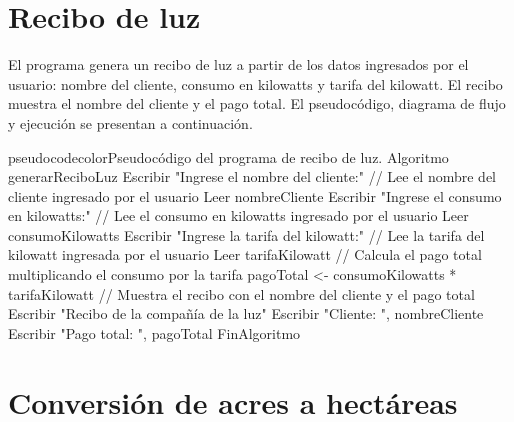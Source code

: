 \documentclass[
	spanish, %
	letterpaper, oneside
]{article}
\begin{document}


\section{Recibo de luz}

El programa genera un recibo de luz a partir de los datos ingresados por el usuario: nombre del cliente, consumo en kilowatts y tarifa del kilowatt. El recibo muestra el nombre del cliente y el pago total. El pseudocódigo, diagrama de flujo y ejecución se presentan a continuación.

\begin{sourcecode}{pseudocodecolor}{Pseudocódigo del programa de recibo de luz.}
Algoritmo generarReciboLuz
    Escribir "Ingrese el nombre del cliente:"
    // Lee el nombre del cliente ingresado por el usuario
    Leer nombreCliente
    Escribir "Ingrese el consumo en kilowatts:"
    // Lee el consumo en kilowatts ingresado por el usuario
    Leer consumoKilowatts
    Escribir "Ingrese la tarifa del kilowatt:"
    // Lee la tarifa del kilowatt ingresada por el usuario
    Leer tarifaKilowatt
    // Calcula el pago total multiplicando el consumo por la tarifa
    pagoTotal <- consumoKilowatts * tarifaKilowatt
    // Muestra el recibo con el nombre del cliente y el pago total
    Escribir "Recibo de la compañía de la luz"
    Escribir "Cliente: ", nombreCliente
    Escribir "Pago total: ", pagoTotal
FinAlgoritmo
\end{sourcecode}



\section{Conversión de acres a hectáreas}
\end{document}
